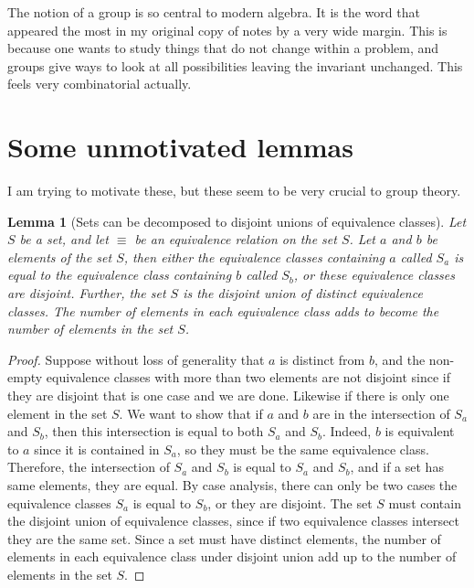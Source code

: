 \documentclass{tufte-book}
\newtheorem{lemma}[theorem]{Lemma}
\begin{document}
The notion of a group is so central to modern algebra. It is the word that appeared the most in my original copy of notes by a very wide margin. This is because one wants to study things that do not change within a problem, and groups give ways to look at all possibilities leaving the invariant unchanged. This feels very combinatorial actually.

\section{Some unmotivated lemmas}

I am trying to motivate these, but these seem to be very crucial to group theory.

\begin{lemma}[Sets can be decomposed to disjoint unions of equivalence classes]
  \label{set-equiv-class-decomp}
  Let $S$ be a set, and let $\equiv$ be an equivalence relation on the set $S$.
  Let $a$ and $b$ be elements of the set $S$, then either 
  the equivalence classes containing $a$ called $S_{a}$ is equal to the 
  equivalence class containing $b$ called $S_{b}$, or these equivalence classes are disjoint.
  Further, the set $S$ is the disjoint union of distinct equivalence classes.
  The number of elements in each equivalence class adds to become the number of elements in the set $S$.
\end{lemma}

\begin{proof}
  Suppose without loss of generality that $a$ is distinct from $b$, and the non-empty equivalence classes
  with more than two elements are not disjoint since if they are disjoint that is one case and we are done.
  Likewise if there is only one element in the set $S$.
  We want to show that if $a$ and $b$ are in the intersection of $S_{a}$ and $S_{b}$, then this intersection is equal to
  both $S_a$ and $S_b$. Indeed, $b$ is equivalent to $a$ since it is contained in $S_a$, so they must be the same equivalence class.
  Therefore, the intersection of $S_{a}$ and $S_{b}$ is equal to $S_a$ and $S_b$, and if a set has same elements, they are equal.
  By case analysis, there can only be two cases the equivalence classes $S_a$ is equal to $S_b$, or they are disjoint.
  The set $S$ must contain the disjoint union of equivalence classes, since if two equivalence classes intersect they are the same set.
  Since a set must have distinct elements, the number of elements in each equivalence class under disjoint union add up to the number of elements in the set $S$.
\end{proof}
\end{document}
